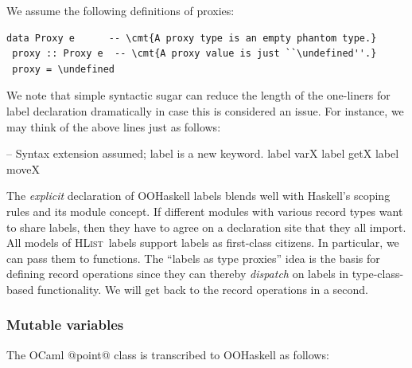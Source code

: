 \documentclass{jfp}
\newcommand{\cmt}[1]{\mbox{\textrm{\emph{#1}}}}
\newcommand{\HList}{\textsc{HList}}
\newcommand{\undefined}{\ensuremath{\bot}}
\begin{document}
We assume the following definitions of proxies:

\begin{Verbatim}[fontsize=\small,commandchars=\\\{\}]
 data Proxy e      -- \cmt{A proxy type is an empty phantom type.}
 proxy :: Proxy e  -- \cmt{A proxy value is just ``\undefined''.}
 proxy = \undefined
\end{Verbatim}

We note that simple syntactic sugar can reduce the length of the
one-liners for label declaration dramatically in case this is
considered an issue. For instance, we may think of the above lines
just as follows:

\begin{code}
 -- Syntax extension assumed; label is a new keyword.
 label varX
 label getX
 label moveX
\end{code}

The \emph{explicit} declaration of OOHaskell labels blends well with
Haskell's scoping rules and its module concept. If different modules
with various record types want to share labels, then they have to
agree on a declaration site that they all import. All models of
\HList\ labels support labels as first-class citizens. In particular,
we can pass them to functions. The ``labels as type proxies'' idea is
the basis for defining record operations since they can thereby
\emph{dispatch} on labels in type-class-based functionality. We
will get back to the record operations in a second.






\subsubsection{Mutable variables}

The OCaml @point@ class is transcribed to OOHaskell as follows:

\end{document}
